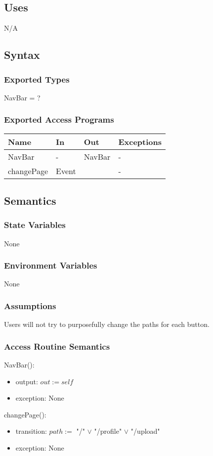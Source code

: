 \documentclass[12pt, titlepage]{article}
\begin{document}
\subsection{Uses}
N/A
\subsection{Syntax}
\subsubsection{Exported Types}
NavBar = ?
\subsubsection{Exported Access Programs}
\begin{center}
	\begin{tabular}{p{3cm} p{4cm} p{4cm} p{3cm}}
		\hline
		\textbf{Name} & \textbf{In} & \textbf{Out} & \textbf{Exceptions} \\
		\hline
		NavBar & - & NavBar & - \\
		changePage & Event &  & - \\
		\hline
	\end{tabular}
\end{center}
\subsection{Semantics}
\subsubsection{State Variables}
None
\subsubsection{Environment Variables}
None
\subsubsection{Assumptions}
Users will not try to purposefully change the paths for each button.
\subsubsection{Access Routine Semantics}
\noindent NavBar():
\begin{itemize}
	\item output: $out := self$ 
	\item exception: None
\end{itemize}
\noindent changePage():
\begin{itemize}
	\item transition: $path :=$ "/" $\lor$ "/profile" $\lor$ "/upload" 
	\item exception: None
\end{itemize}
\end{document}
